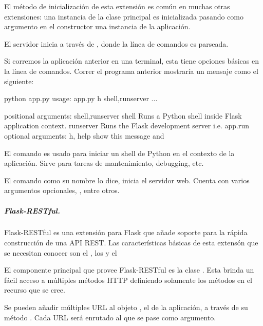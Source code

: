 El método de inicialización de esta extensión es común en muchas otras
extensiones: una instancia de la clase principal es inicializada pasando como
argumento en el constructor una instancia de la aplicación.

El servidor inicia a través de , donde la línea de comandos
es parseada.

Si corremos la aplicación anterior en una terminal, esta tiene opciones básicas
en la línea de comandos. Correr el programa anterior mostraría un mensaje como
el siguiente:

\begin{sphinxVerbatim}[commandchars=\\\{\}]
\PYGZdl{} python app.py
usage: app.py \PYG{o}{[}\PYGZhy{}h\PYG{o}{]} shell,runserver ...

positional arguments:
shell,runserver
  shell Runs a Python shell inside Flask application context.
  runserver Runs the Flask development server i.e. app.run
optional arguments:
  \PYGZhy{}h, \PYGZhy{}\PYGZhy{}help  show this  message and 
\end{sphinxVerbatim}

El comando  es usado para iniciar un shell de Python en el contexto
de la aplicación. Sirve para tareas de mantenimiento, debugging, etc.

El comando  como su nombre lo dice, inicia el servidor web. Cuenta
con varios argumentos opcionales, ,
entre otros.


\subparagraph{Flask-RESTful.}
\label{\detokenize{chapter_two/desc_cloudnao:flask-restful}}
Flask-RESTful es una extensión para Flask que añade soporte para la rápida
construcción de una API REST. Las características básicas de esta extensón
que se necesitan conocer
son el , los  y el 

El componente principal que provee Flask-RESTful es la clase .
Esta brinda un fácil acceso a múltiples métodos HTTP definiendo
solamente los métodos en el recurso que se cree.

Se pueden añadir múltiples URL al objeto , el 
de la aplicación, a través de su método . Cada URL será
enrutado al  que se pase como argumento.

